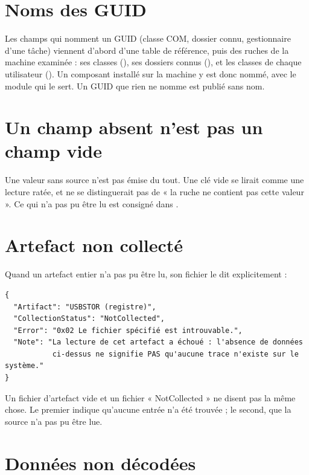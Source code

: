 \documentclass[11pt,a4paper,oneside]{report}
\begin{document}
\section{Noms des GUID}

Les champs qui nomment un GUID (classe COM, dossier connu, gestionnaire d'une
tâche) viennent d'abord d'une table de référence, puis des ruches de la machine
examinée : ses classes (), ses dossiers connus (), et les classes de
chaque utilisateur (). Un composant installé sur la
machine y est donc nommé, avec le module qui le sert. Un GUID que rien ne nomme
est publié sans nom.

\section{Un champ absent n'est pas un champ vide}

Une valeur sans source n'est pas émise du tout. Une clé vide se lirait comme une
lecture ratée, et ne se distinguerait pas de « la ruche ne contient pas cette
valeur ». Ce qui n'a pas pu être lu est consigné dans
.

\section{Artefact non collecté}

Quand un artefact entier n'a pas pu être lu, son fichier le dit explicitement :

\begin{lstlisting}
{
  "Artifact": "USBSTOR (registre)",
  "CollectionStatus": "NotCollected",
  "Error": "0x02 Le fichier spécifié est introuvable.",
  "Note": "La lecture de cet artefact a échoué : l'absence de données
           ci-dessus ne signifie PAS qu'aucune trace n'existe sur le système."
}
\end{lstlisting}

\begin{attention}
Un fichier d'artefact vide et un fichier « NotCollected » ne disent pas la même
chose. Le premier indique qu'aucune entrée n'a été trouvée ; le second, que
la source n'a pas pu être lue.
\end{attention}

\section{Données non décodées}
\end{document}
